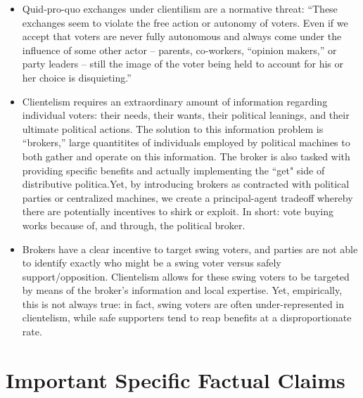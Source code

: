 \documentclass[12pt]{article}
\begin{document}
\begin{itemize}[leftmargin=*, itemsep=4pt]
    \begin{quote}
        ``We have never insisted that the franchise be exercised without tain of individual benefit; indeed, our tradition of political pluralism is partly predicated on the expectation that voters will pursue their individual good through the political process, and that the summation of these individual pursuits will further the collective welfare. So long as the hoped-for personal benefit is to be achieved through the normal processes of government, and not through some private arrangement, it always has been, and remains, a reputable basis upon which to cast one's ballot."
    \end{quote}
    \item Quid-pro-quo exchanges under clientilism are a normative threat: ``These exchanges seem to violate the free action or autonomy of voters. Even if we accept that voters are never fully autonomous and always come under the influence of some other actor -- parents, co-workers, ``opinion makers,'' or party leaders -- still the image of the voter being held to account for his or her choice is disquieting.''
    \item Clientelism requires an extraordinary amount of information regarding individual voters: their needs, their wants, their political leanings, and their ultimate political actions. The solution to this information problem is ``brokers,'' large quantitites of individuals employed by political machines to both gather and operate on this information. The broker is also tasked with providing specific benefits and actually implementing the ``get" side of distributive politica.Yet, by introducing brokers as contracted with political parties or centralized machines, we create a principal-agent tradeoff whereby there are potentially incentives to shirk or exploit. In short: vote buying works because of, and through, the political broker.
    \item Brokers have a clear incentive to target swing voters, and parties are not able to identify exactly who might be a swing voter versus safely support/opposition. Clientelism allows for these swing voters to be targeted by means of the broker's information and local expertise. Yet, empirically, this is not always true: in fact, swing voters are often under-represented in clientelism, while safe supporters tend to reap benefits at a disproportionate rate.
\end{itemize}


\section{Important Specific Factual Claims}
\end{document}
